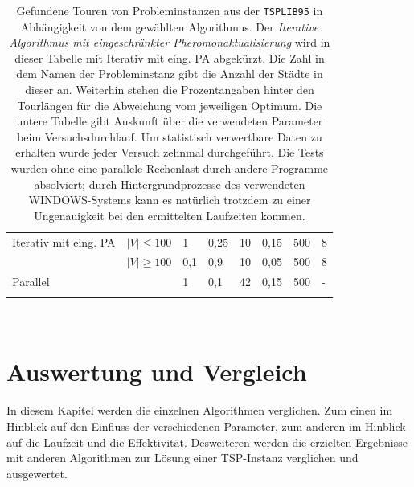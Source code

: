 \documentclass[doktyp=barbeit, sprache=german]{TUBAFarbeiten}
\begin{document}
\begin{landscape}
\begin{table}[]
{\begin{tabular}{ll|llllll}
Iterativ mit eing. PA & $|V| \leq 100$ & 1     & 0,25 & 10                    & 0,15                      & 500               & 8                                                                                                 \\
                      & $|V| \geq 100$ & 0,1   & 0,9  & 10                    & 0,05                      & 500               & 8                                                                                                 \\ \hline
Parallel              &                      & 1     & 0,1  & 42                    & 0,15                      & 500               & -                                                                                                 \\ \bottomrule
\multicolumn{8}{l}{}  \\ 
\end{tabular}%
}
\\\caption[Gefundene Touren von Probleminstanzen aus der \texttt{TSPLIB95} in Abhängigkeit von dem gewählten Algorithmus]{Gefundene Touren von Probleminstanzen aus der \texttt{TSPLIB95} in Abhängigkeit von dem gewählten Algorithmus. Der \textit{Iterative Algorithmus mit eingeschränkter Pheromonaktualisierung} wird in dieser Tabelle mit \glqq Iterativ mit eing. PA\grqq{} abgekürzt. Die Zahl in dem Namen der Probleminstanz gibt die Anzahl der Städte in dieser an. Weiterhin stehen die Prozentangaben hinter den Tourlängen für die Abweichung vom jeweiligen Optimum. Die untere Tabelle gibt Auskunft über die verwendeten Parameter beim Versuchsdurchlauf. Um statistisch verwertbare Daten zu erhalten wurde jeder Versuch zehnmal durchgeführt. Die Tests wurden ohne eine parallele Rechenlast durch andere Programme absolviert; durch Hintergrundprozesse des verwendeten WINDOWS-Systems kann es natürlich trotzdem zu einer Ungenauigkeit bei den ermittelten Laufzeiten kommen.}
\label{table1}
\end{table}
\end{landscape}
\section{Auswertung und Vergleich}
In diesem Kapitel werden die einzelnen Algorithmen verglichen. Zum einen im Hinblick auf den Einfluss der verschiedenen Parameter, zum anderen im Hinblick auf die Laufzeit und die Effektivität. Desweiteren werden die erzielten Ergebnisse mit anderen Algorithmen zur Lösung einer TSP-Instanz verglichen und ausgewertet.
\end{document}
